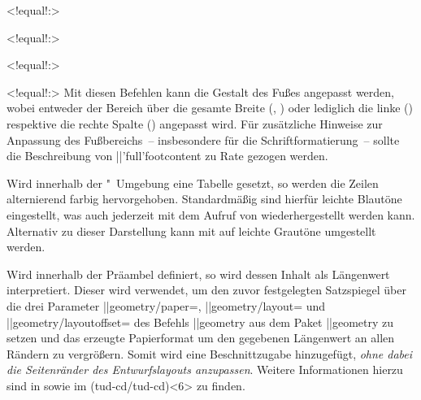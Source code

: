 \begin{DeclareEntity}{}
\begin{Declaration}
  {}
  <!equal!:>
\begin{Declaration}
  {}
  <!equal!:>
\begin{Declaration}
  {}
  <!equal!:>
\begin{Declaration}
  {}
  <!equal!:>
\printdeclarationlist
%
Mit diesen Befehlen kann die Gestalt des Fußes angepasst werden, wobei entweder 
der Bereich über die gesamte Breite (, ) 
oder lediglich die linke () respektive die rechte Spalte 
() angepasst wird. Für zusätzliche Hinweise zur Anpassung 
des Fußbereichs~-- insbesondere für die Schriftformatierung~-- sollte die 
Beschreibung von \Macro||'full'{footcontent} zu Rate gezogen werden.
\end{Declaration}
\end{Declaration}
\end{Declaration}
\end{Declaration}

\begin{Declaration}
  {}
\begin{Declaration}
  {}
\begin{Declaration}
  {}
\printdeclarationlist
%
Wird innerhalb der "~Umgebung eine Tabelle gesetzt, 
so werden die Zeilen alternierend farbig hervorgehoben. Standardmäßig sind 
hierfür leichte Blautöne eingestellt, was auch jederzeit mit dem Aufruf von 
 wiederhergestellt werden kann. Alternativ zu dieser 
Darstellung kann mit  auf leichte Grautöne umgestellt werden.
\end{Declaration}
\end{Declaration}
\end{Declaration}

\begin{Declaration}
  {}
\printdeclarationlist
%
Wird  innerhalb der Präambel definiert, so wird dessen 
Inhalt als Längenwert interpretiert. Dieser wird verwendet, um den zuvor 
festgelegten Satzspiegel über die drei Parameter
\Macro||{geometry/paper=}, 
\Macro||{geometry/layout=} und 
\Macro||{geometry/layoutoffset=\PLength} 
des Befehls \Macro||{geometry} aus dem Paket \Package||{geometry} zu setzen und 
das erzeugte Papierformat um den gegebenen Längenwert an allen Rändern zu 
vergrößern. Somit wird eine Beschnittzugabe hinzugefügt, 
\emph{ohne dabei die Seitenränder des Entwurfslayouts anzupassen}. Weitere 
Informationen hierzu sind in  sowie im 
\GitHubRepo(tud-cd/tud-cd)<6> zu finden.
\end{Declaration}
%
\end{DeclareEntity}
